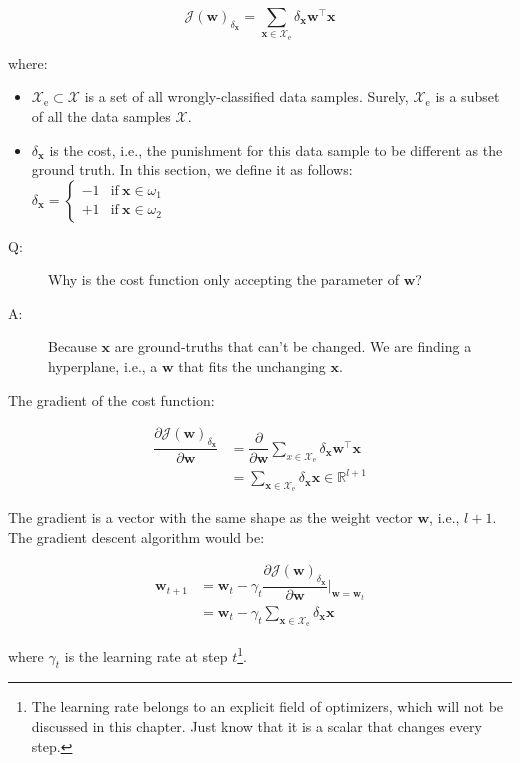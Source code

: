 \documentclass{article}
\begin{document}
\begin{equation}
    {\mathcal{J}(\mathbf{w})}_{\delta_{\mathbf{x}}} = 
        \sum_{\mathbf{x}\in\mathcal{X}_{\text{e}}}
        \delta_{\mathbf{x}}
        \mathbf{w}^\top \mathbf{x}
\end{equation}

where:

\begin{itemize}
    \item $\mathcal{X}_{\text{e}} \subset \mathcal{X}$ is a set of all wrongly-classified data samples. Surely, $\mathcal{X}_{\text{e}}$ is a subset of all the data samples $\mathcal{X}$.
    \item $\delta_{\mathbf{x}}$ is the cost, i.e., the punishment for this data sample to be different as the ground truth. In this section, we define it as follows: \\ $\delta_{\mathbf{x}}=\begin{cases}-1 & \text{if} \ \mathbf{x}\in\omega_1 \\ +1 & \text{if} \ \mathbf{x}\in\omega_2\end{cases}$
\end{itemize}

\begin{description}
    \item[Q:] Why is the cost function only accepting the parameter of $\mathbf{w}$?
    \item[A:] Because $\mathbf{x}$ are ground-truths that can't be changed. We are finding a hyperplane, i.e., a $\mathbf{w}$ that fits the unchanging $\mathbf{x}$.
\end{description}

The gradient of the cost function:

\begin{align}
    \dfrac
        {\partial {\mathcal{J}(\mathbf{w})}_{\delta_{\mathbf{x}}}}
        {\partial \mathbf{w}}
    &= 
    \dfrac
        {\partial}
        {\partial\mathbf{w}} 
    \sum_{x\in\mathcal{X}_{\text{e}}} 
    \delta_{\mathbf{x}} 
    \mathbf{w}^\top 
    \mathbf{x}
    \\
    &= 
    \sum_{\mathbf{x}\in\mathcal{X}_{\text{e}}}
    \delta_{\mathbf{x}}
    \mathbf{x} 
    \in \mathbb{R}^{l+1}
\end{align}

The gradient is a vector with the same shape as the weight vector $\mathbf{w}$, i.e., $l+1$. The gradient descent algorithm would be:

\begin{align}
    \mathbf{w}_{t+1} 
    &= 
        \mathbf{w}_{t} - 
        \gamma_{t} 
        \dfrac{\partial {\mathcal{J}(\mathbf{w})}_{\delta_{\mathbf{x}}}}
            {\partial \mathbf{w}}
        \Biggl|_{\mathbf{w}=\mathbf{w}_t}
    \\
    &= 
        \mathbf{w}_{t} -
        \gamma_{t}
        \sum_{\mathbf{x}\in\mathcal{X}_{\text{e}}}
        \delta_{\mathbf{x}}\mathbf{x}
\end{align}

where $\gamma_{t}$ is the learning rate at step $t$\footnote{
    The learning rate belongs to an explicit field of optimizers, which will not be discussed in this chapter. Just know that it is a scalar that changes every step.
}.
\end{document}
